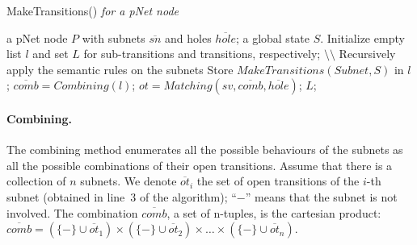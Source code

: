 \documentclass[smallcondensed]{svjour3}
\newcommand{\noteSB}[2][color=green!40, size=\tiny]{\todo[#1]{{\bf
      Note: } {#2}}}
\newcommand{\noteInSB}[2][inline,color=green!40]{\todo[#1]{{\bf Simon: } {#2}}}
\begin{document}

\begin{algorithm}[h]
\caption{MakeTransitions() \em{for a pNet node}}
  \label{alg2}
\begin{algorithmic}[1]
\Require a pNet node $P$ with subnets $\overline{sn}$ and holes $\overline{hole}$; a global state $S$.
\State Initialize empty list $l$ and set $L$ for sub-transitions and transitions, respectively;
        \hfill $\setminus \setminus$ Recursively apply the semantic rules on the subnets
           \State Store $\mathit{MakeTransitions}(Subnet, S)$ in $l$;
	\EndFor
	\State $\overline{comb} = \mathit{Combining}(l)$;
           \State $ot = \mathit{Matching}(sv, \overline{\mathit{comb}}, \overline{\mathit{hole}})$;
	\EndFor
\State \Return $L$;
\end{algorithmic}  
\end{algorithm}



%
%


\def\inactive{\{-\}}
\paragraph{Combining.}
The combining method enumerates all the possible behaviours of the
subnets as all the possible combinations of their open transitions.
Assume that there is a collection of $n$ subnets.
We denote $\overline{ot}_i$ the set of open
transitions of the $i$-th
subnet (obtained in line~3 of the algorithm); %
``$-$'' means that the subnet is not involved.
The combination $\overline{comb}$, a set of n-tuples, is the
cartesian product:  
$\overline{comb} = (\inactive\cup \overline{ot}_1) \times (\inactive\cup \overline{ot}_2)\times \dots \times (\inactive\cup \overline{ot}_n)$.
\end{document}
